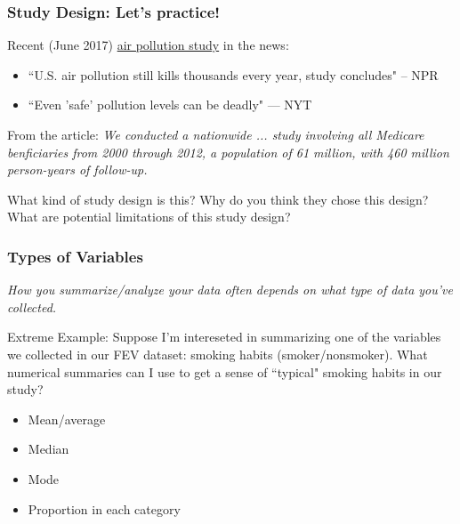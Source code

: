 \documentclass[12pt, 
hyperref={colorlinks=true, linkcolor=blue, urlcolor=cyan}]{beamer}
\begin{document}
\begin{frame}
\frametitle{Study Design: Let's practice!}

Recent (June 2017) \href{http://www.nejm.org/doi/10.1056/NEJMoa1702747}{air pollution study} in the news: \vspace{-0.3cm}
\begin{itemize} %
\item ``U.S. air pollution still kills thousands every year, study concludes" -- NPR
\item ``Even 'safe' pollution levels can be deadly" --- NYT
\end{itemize}

From the article: \textit{We conducted a nationwide ... study involving all Medicare benficiaries from 2000 through 2012, a population of 61 million, with 460 million person-years of follow-up.}

\color{blue} What kind of study design is this? Why do you think they chose this design? What are potential limitations of this study design? \color{black} %
\end{frame}

\begin{frame}
\frametitle{Types of Variables} %

\textit{How you summarize/analyze your data often depends on what type of data you've collected.}

\color{blue} Extreme Example: \color{black} Suppose I'm intereseted in summarizing one of the variables we collected in our FEV dataset: smoking habits (smoker/nonsmoker).  What numerical summaries can I use to get a sense of ``typical" smoking habits in our study? \vspace{-0.3cm}
\begin{itemize}
\item Mean/average
\item Median
\item Mode
\item Proportion in each category
\end{itemize}
\end{frame}
\end{document}
